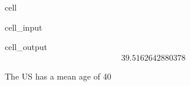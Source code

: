 \documentclass[letterpaper,10pt,english]{jupyterBook}
\begin{document}
\begin{sphinxuseclass}{cell}\begin{sphinxVerbatimInput}

\begin{sphinxuseclass}{cell_input}
\begin{sphinxVerbatim}[commandchars=\\\{\}]
\end{sphinxVerbatim}

\end{sphinxuseclass}\end{sphinxVerbatimInput}
\begin{sphinxVerbatimOutput}

\begin{sphinxuseclass}{cell_output}\begin{equation*}
\begin{split}39.5162642880378\end{split}
\end{equation*}
\end{sphinxuseclass}\end{sphinxVerbatimOutput}

\end{sphinxuseclass}
\sphinxAtStartPar
The US has a mean age of 40
\end{document}
